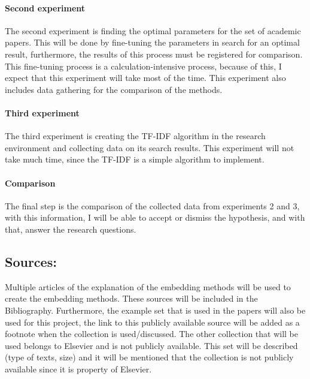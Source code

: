 \documentclass[10pt,a4paper]{article}
\begin{document}
\paragraph{Second experiment}The second experiment is finding the optimal parameters for the set of academic papers. This will be done by fine-tuning the parameters in search for an optimal result, furthermore, the results of this process must be registered for comparison. This fine-tuning process is a calculation-intensive process, because of this, I expect that this experiment will take most of the time. This experiment also includes data gathering for the comparison of the methods.\\
\paragraph{Third experiment}The third experiment is creating the TF-IDF algorithm in the research environment and collecting data on its search results. This experiment will not take much time, since the TF-IDF is a simple algorithm to implement.\\
\paragraph{Comparison}
The final step is the comparison of the collected data from experiments 2 and 3, with this information, I will be able to accept or dismiss the hypothesis, and with that, answer the research questions.\\

\subsection{Sources:}
Multiple articles of the explanation of the embedding methods will be used to create the embedding methods. These sources will be included in the Bibliography. Furthermore, the example set that is used in the papers will also be used for this project, the link to this publicly available source will be added as a footnote when the collection is used/discussed. The other collection that will be used belongs to Elsevier and is not publicly available. This set will be described (type of texts, size) and it will be mentioned that the collection is not publicly available since it is property of Elsevier. 
\end{document}
